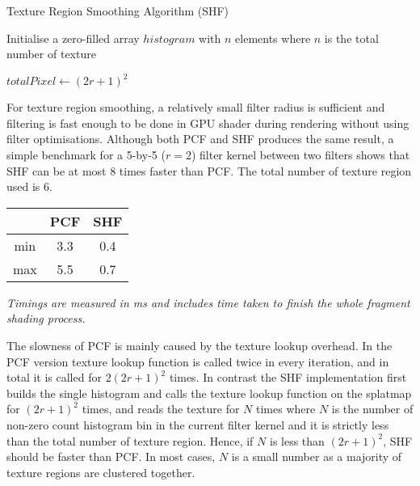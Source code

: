 \documentclass[oneside, a4paper]{report}
\begin{document}
    \begin{algorithm}[H]
        \caption{Texture Region Smoothing Algorithm (SHF)}

        Initialise a zero-filled array \(histogram\) with \(n\) elements where \(n\) is the total number of texture\;
        
        \(totalPixel \leftarrow (2r + 1)^{2}\)\;

    \end{algorithm}

    For texture region smoothing, a relatively small filter radius is sufficient and filtering is fast enough to be done in GPU shader during rendering without using filter optimisations. Although both PCF and SHF produces the same result, a simple benchmark for a 5-by-5 ($r = 2$) filter kernel between two filters shows that SHF can be at most 8 times faster than PCF. The total number of texture region used is 6.

    \begin{center}
        \begin{tabular}{|c||c|c|}
            \hline
            {} & PCF & SHF \\
            \hline
            \hline
            min & 3.3 & 0.4 \\
            \hline
            max & 5.5 & 0.7 \\
            \hline
        \end{tabular}
    \end{center}
    \textit{Timings are measured in ms and includes time taken to finish the whole fragment shading process.}

    The slowness of PCF is mainly caused by the texture lookup overhead. In the PCF version texture lookup function is called twice in every iteration, and in total it is called for \(2(2r + 1)^{2}\) times. In contrast the SHF implementation first builds the single histogram and calls the texture lookup function on the splatmap for \((2r + 1)^{2}\) times, and reads the texture for $N$ times where $N$ is the number of non-zero count histogram bin in the current filter kernel and it is strictly less than the total number of texture region. Hence, if $N$ is less than \((2r + 1)^{2}\), SHF should be faster than PCF. In most cases, $N$ is a small number as a majority of texture regions are clustered together.
\end{document}
